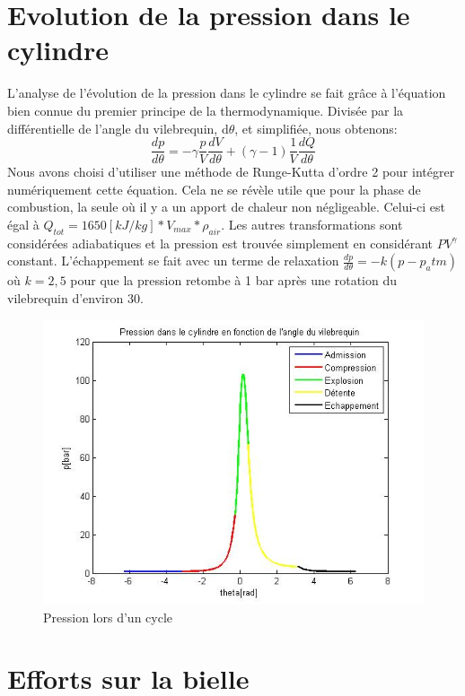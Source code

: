 \documentclass[a4paper,oneside,12pt]{report}
\begin{document}
\section{Evolution de la pression dans le cylindre}

L'analyse de l'évolution de la pression dans le cylindre se fait grâce à l'équation bien connue du premier principe de la thermodynamique. Divisée par la différentielle de l'angle du vilebrequin, d$\theta$, et simplifiée, nous obtenons:
$$\frac{dp}{d\theta}=-\gamma\frac{p}{V}\frac{dV}{d\theta}+(\gamma - 1) \frac{1}{V}\frac{dQ}{d\theta}$$
Nous avons choisi d'utiliser une méthode de Runge-Kutta d'ordre 2 pour intégrer numériquement cette équation. Cela ne se révèle utile que pour la phase de combustion, la seule où il y a un apport de chaleur non négligeable. Celui-ci est égal à $Q_{tot}=1650[kJ/kg] * V_{max} * \rho_{air}$. Les autres transformations sont considérées adiabatiques et la pression est trouvée simplement en considérant $PV^{\gamma}$ constant. L'échappement se fait avec un terme de relaxation $\frac{dp}{d\theta}=-k(p-p_atm)$ où $k=2,5$ pour que la pression retombe à 1 bar après une rotation du vilebrequin d'environ 30\degre.

\begin{figure}[H]
	\center
	\includegraphics[scale=0.6]{pression.jpg}
	\caption{Pression lors d'un cycle}
\end{figure}

\section{Efforts sur la bielle}
\end{document}

